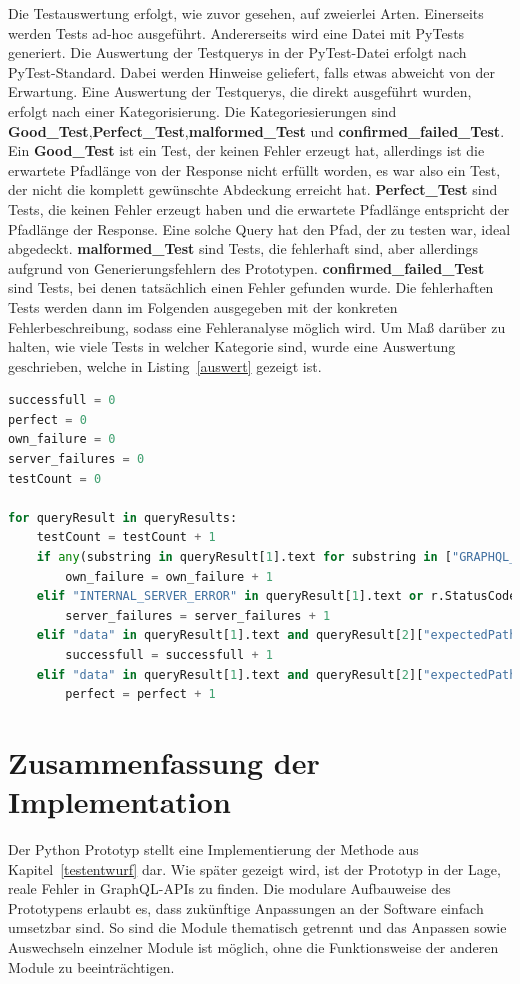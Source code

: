 Die Testauswertung erfolgt, wie zuvor gesehen, auf zweierlei Arten.
Einerseits werden Tests ad-hoc ausgeführt.
Andererseits wird eine Datei mit PyTests generiert.
Die Auswertung der Testquerys in der PyTest-Datei erfolgt nach PyTest-Standard. Dabei werden Hinweise geliefert, falls etwas abweicht von der Erwartung.
Eine Auswertung der Testquerys, die direkt ausgeführt wurden, erfolgt nach einer Kategorisierung.
Die Kategoriesierungen sind \textbf{Good\_Test},\textbf{Perfect\_Test},\textbf{malformed\_Test} und \textbf{confirmed\_failed\_Test}.
Ein \textbf{Good\_Test} ist ein Test, der keinen Fehler erzeugt hat, allerdings ist die erwartete Pfadlänge von der Response nicht erfüllt worden, es war also ein Test,
der nicht die komplett gewünschte Abdeckung erreicht hat.
\textbf{Perfect\_Test} sind Tests, die keinen Fehler erzeugt haben und die erwartete Pfadlänge entspricht der Pfadlänge der Response.
Eine solche Query hat den Pfad, der zu testen war, ideal abgedeckt.
\textbf{malformed\_Test} sind Tests, die fehlerhaft sind, aber allerdings aufgrund von Generierungsfehlern des Prototypen.
\textbf{confirmed\_failed\_Test} sind Tests, bei denen tatsächlich einen Fehler gefunden wurde.
Die fehlerhaften Tests werden dann im Folgenden ausgegeben mit der konkreten Fehlerbeschreibung, sodass eine Fehleranalyse möglich wird.
Um Maß darüber zu halten, wie viele Tests in welcher Kategorie sind, wurde eine Auswertung geschrieben, welche in Listing~\ref{auswert} gezeigt ist.

\begin{lstlisting}[language=Python, caption={Auswertung der Antworten}, label={auswert}]
successfull = 0
perfect = 0
own_failure = 0
server_failures = 0
testCount = 0

for queryResult in queryResults:
    testCount = testCount + 1
    if any(substring in queryResult[1].text for substring in ["GRAPHQL_PARSE_FAILED", "GRAPHQL_VALIDATION_FAILED"]):
        own_failure = own_failure + 1
    elif "INTERNAL_SERVER_ERROR" in queryResult[1].text or r.StatusCode == 500:
        server_failures = server_failures + 1
    elif "data" in queryResult[1].text and queryResult[2]["expectedPathLength"] > queryResult[2]["pathLengthFromResult"]:
        successfull = successfull + 1
    elif "data" in queryResult[1].text and queryResult[2]["expectedPathLength"] == queryResult[2]["pathLengthFromResult"]:
        perfect = perfect + 1
\end{lstlisting}

\newpage

\section{Zusammenfassung der Implementation}

Der Python Prototyp stellt eine Implementierung der Methode aus Kapitel~\ref{testentwurf} dar.
Wie später gezeigt wird, ist der Prototyp in der Lage, reale Fehler in GraphQL-APIs zu finden.
Die modulare Aufbauweise des Prototypens erlaubt es, dass zukünftige Anpassungen an der Software einfach umsetzbar sind.
So sind die Module thematisch getrennt und das Anpassen sowie Auswechseln einzelner Module ist möglich, ohne die Funktionsweise
der anderen Module zu beeinträchtigen.


